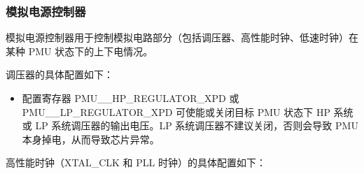 \documentclass[main\_\_CN.tex]{subfiles}
\begin{document}
\subsubsection{模拟电源控制器}\label{sec:pmu_analog_power_controller}

模拟电源控制器用于控制模拟电路部分（包括调压器、高性能时钟、低速时钟）在某种 PMU 状态下的上下电情况。

调压器的具体配置如下：

\begin{itemize}
\item 配置寄存器 PMU\_\_HP\_REGULATOR\_XPD 或PMU\_\_LP\_REGULATOR\_XPD 可使能或关闭目标 PMU 状态下 HP 系统或 LP 系统调压器的输出电压。LP 系统调压器不建议关闭，否则会导致 PMU 本身掉电，从而导致芯片异常。
\end{itemize}

高性能时钟（XTAL\_CLK 和 PLL 时钟）的具体配置如下：
\end{document}

